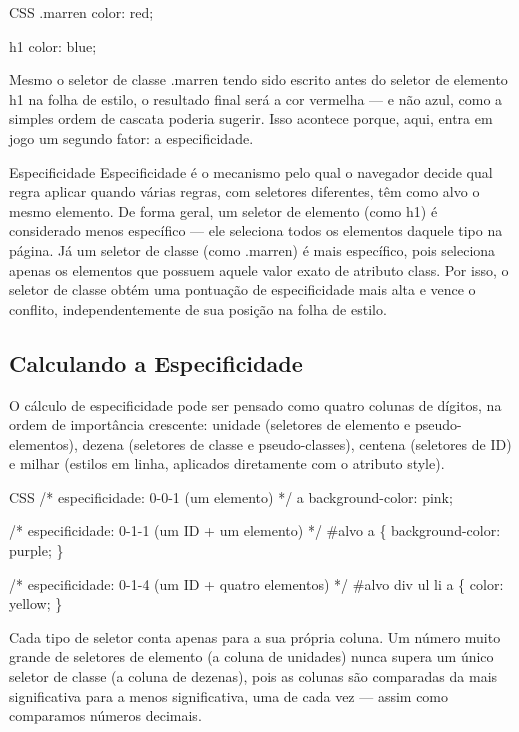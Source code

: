 \begin{codebox}{CSS}
 .marren {
   color: red;
 }

 h1 {
   color: blue;
 }
\end{codebox}

Mesmo o seletor de classe .marren tendo sido escrito antes do seletor de elemento h1 na folha de estilo, o resultado final será a cor vermelha — e não azul, como a simples ordem de cascata poderia sugerir. Isso acontece porque, aqui, entra em jogo um segundo fator: a especificidade.

Especificidade Especificidade é o mecanismo pelo qual o navegador decide qual regra aplicar quando várias regras, com seletores diferentes, têm como alvo o mesmo elemento. De forma geral, um seletor de elemento (como h1) é considerado menos específico — ele seleciona todos os elementos daquele tipo na página. Já um seletor de classe (como .marren) é mais específico, pois seleciona apenas os elementos que possuem aquele valor exato de atributo class. Por isso, o seletor de classe obtém uma pontuação de especificidade mais alta e vence o conflito, independentemente de sua posição na folha de estilo.

\subsection{Calculando a Especificidade}

O cálculo de especificidade pode ser pensado como quatro colunas de dígitos, na ordem de importância crescente: unidade (seletores de elemento e pseudo-elementos), dezena (seletores de classe e pseudo-classes), centena (seletores de ID) e milhar (estilos em linha, aplicados diretamente com o atributo style).

\begin{codebox}{CSS}
/* especificidade: 0-0-1 (um elemento) */
a {
  background-color: pink;
}
\end{codebox}

/* especificidade: 0-1-1 (um ID + um elemento) */ \#alvo a \{ background-color: purple; \}

/* especificidade: 0-1-4 (um ID + quatro elementos) */ \#alvo div ul li a \{ color: yellow; \}

Cada tipo de seletor conta apenas para a sua própria coluna. Um número muito grande de seletores de elemento (a coluna de unidades) nunca supera um único seletor de classe (a coluna de dezenas), pois as colunas são comparadas da mais significativa para a menos significativa, uma de cada vez — assim como comparamos números decimais.

